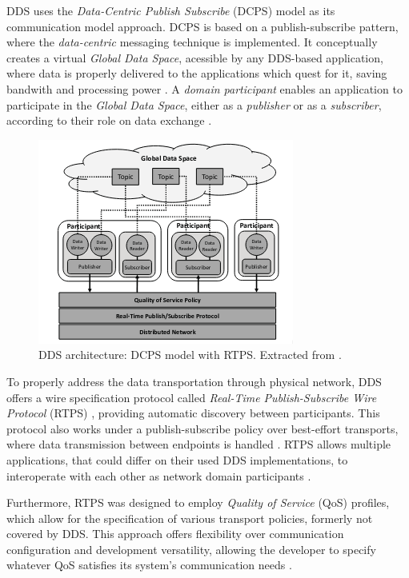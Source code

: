 DDS uses the \textit{Data-Centric Publish Subscribe} (DCPS) model as its communication model approach. DCPS is based on a publish-subscribe pattern, where the \textit{data-centric} messaging technique is implemented. It conceptually creates a virtual \textit{Global Data Space}, acessible by any DDS-based application, where data is properly delivered to the applications which quest for it, saving bandwith and processing power \cite{3, pardo2005introduction}. A \textit{domain participant} enables an application to participate in the \textit{Global Data Space}, either as a \textit{publisher} or as a \textit{subscriber}, according to their role on data exchange \cite{maruyama2016exploring, alaerjan2017modeling, dcps-rtps}. 

\begin{figure}[H]
    \centering
    \includegraphics[width=0.4\linewidth]{images/dcps-model.png}
    \caption{DDS architecture: DCPS model with RTPS. Extracted from \cite{maruyama2016exploring}.}
    \label{fig:dcps-model}
\end{figure}

To properly address the data transportation through physical network, DDS offers a wire specification protocol called \textit{Real-Time Publish-Subscribe Wire Protocol} (RTPS) \cite{rtps}, providing automatic discovery between participants. This protocol also works under a publish-subscribe policy over best-effort transports, where data transmission between endpoints is handled \cite{yun2017data}. RTPS allows multiple applications, that could differ on their used DDS implementations, to interoperate with each other as network domain participants \cite{dcps-rtps, alaerjan2017modeling}.

Furthermore, RTPS was designed to employ \textit{Quality of Service} (QoS) profiles, which allow for the specification of various transport policies, formerly not covered by DDS. This approach offers flexibility over communication configuration and development versatility, allowing the developer to specify whatever QoS satisfies its system's communication needs \cite{alaerjan2017modeling, diluoffo2018robot, maruyama2016exploring}. 

